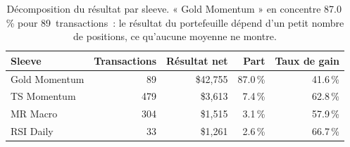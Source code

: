 \begin{table}[H]
\centering
\caption{Décomposition du résultat par sleeve. « Gold Momentum » en concentre 87.0\,\% pour 89~transactions~: le résultat du portefeuille dépend d'un petit nombre de positions, ce qu'aucune moyenne ne montre.}
\label{tab:mt5_by_sleeve}
\begin{tabular}{lrrrr}
\toprule
Sleeve & Transactions & Résultat net & Part & Taux de gain \\
\midrule
Gold Momentum & 89 & \$42,755 & 87.0\,\% & 41.6\,\% \\
TS Momentum & 479 & \$3,613 & 7.4\,\% & 62.8\,\% \\
MR Macro & 304 & \$1,515 & 3.1\,\% & 57.9\,\% \\
RSI Daily & 33 & \$1,261 & 2.6\,\% & 66.7\,\% \\
\bottomrule
\end{tabular}
\end{table}
